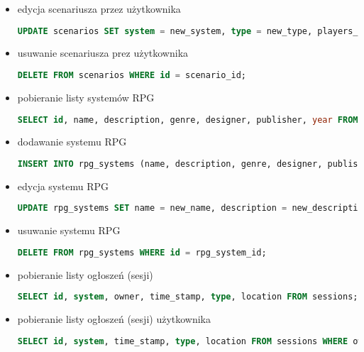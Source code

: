 \begin{itemize}
\item edycja scenariusza przez użytkownika
\begin{lstlisting}[language=SQL]
UPDATE scenarios SET system = new_system, type = new_type, players_count = new_players_count, content = new_content WHERE id = scenario_id;
\end{lstlisting}

\item usuwanie scenariusza prez użytkownika
\begin{lstlisting}[language=SQL]
DELETE FROM scenarios WHERE id = scenario_id;
\end{lstlisting}

\item pobieranie listy systemów RPG
\begin{lstlisting}[language=SQL]
SELECT id, name, description, genre, designer, publisher, year FROM rpg_systems;
\end{lstlisting}

\item dodawanie systemu RPG
\begin{lstlisting}[language=SQL]
INSERT INTO rpg_systems (name, description, genre, designer, publisher, year) VALUES (name_value, description_value, genre_value, designer_value, publisher_value, year_value);
\end{lstlisting}

\item edycja systemu RPG
\begin{lstlisting}[language=SQL]
UPDATE rpg_systems SET name = new_name, description = new_description, genre = new_genre, designer = new_designer, publisher = new_publisher, year = new_year WHERE id = rpg_system_id;
\end{lstlisting}

\item usuwanie systemu RPG
\begin{lstlisting}[language=SQL]
DELETE FROM rpg_systems WHERE id = rpg_system_id;
\end{lstlisting}

\item pobieranie listy ogłoszeń (sesji)
\begin{lstlisting}[language=SQL]
SELECT id, system, owner, time_stamp, type, location FROM sessions;
\end{lstlisting}

\item pobieranie listy ogłoszeń (sesji) użytkownika
\begin{lstlisting}[language=SQL]
SELECT id, system, time_stamp, type, location FROM sessions WHERE owner = current_user;
\end{lstlisting}


\end{itemize}
